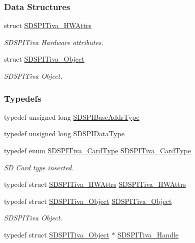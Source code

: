 \subsubsection*{Data Structures}
\begin{DoxyCompactItemize}
\item 
struct \hyperlink{struct_s_d_s_p_i_tiva___h_w_attrs}{S\+D\+S\+P\+I\+Tiva\+\_\+\+H\+W\+Attrs}
\begin{DoxyCompactList}\small\item\em S\+D\+S\+P\+I\+Tiva Hardware attributes. \end{DoxyCompactList}\item 
struct \hyperlink{struct_s_d_s_p_i_tiva___object}{S\+D\+S\+P\+I\+Tiva\+\_\+\+Object}
\begin{DoxyCompactList}\small\item\em S\+D\+S\+P\+I\+Tiva Object. \end{DoxyCompactList}\end{DoxyCompactItemize}
\subsubsection*{Typedefs}
\begin{DoxyCompactItemize}
\item 
typedef unsigned long \hyperlink{_s_d_s_p_i_tiva_8h_ad2ee2f6fbdb79c0577161ae92a7f1650}{S\+D\+S\+P\+I\+Base\+Addr\+Type}
\item 
typedef unsigned long \hyperlink{_s_d_s_p_i_tiva_8h_ae10295fbeb91d6f844cc3694462f6a4b}{S\+D\+S\+P\+I\+Data\+Type}
\item 
typedef enum \hyperlink{_s_d_s_p_i_tiva_8h_a735a3f0fb087ca4e97c2e43ed68b1a0a}{S\+D\+S\+P\+I\+Tiva\+\_\+\+Card\+Type} \hyperlink{_s_d_s_p_i_tiva_8h_a8be51464b363a4b75b1fc43f2c024a7b}{S\+D\+S\+P\+I\+Tiva\+\_\+\+Card\+Type}
\begin{DoxyCompactList}\small\item\em S\+D Card type inserted. \end{DoxyCompactList}\item 
typedef struct \hyperlink{struct_s_d_s_p_i_tiva___h_w_attrs}{S\+D\+S\+P\+I\+Tiva\+\_\+\+H\+W\+Attrs} \hyperlink{_s_d_s_p_i_tiva_8h_ac5f29095c7480b699bca3f48b02aa425}{S\+D\+S\+P\+I\+Tiva\+\_\+\+H\+W\+Attrs}
\item 
typedef struct \hyperlink{struct_s_d_s_p_i_tiva___object}{S\+D\+S\+P\+I\+Tiva\+\_\+\+Object} \hyperlink{_s_d_s_p_i_tiva_8h_ae4ba47bb2c40444c9cc6320f1a36008c}{S\+D\+S\+P\+I\+Tiva\+\_\+\+Object}
\begin{DoxyCompactList}\small\item\em S\+D\+S\+P\+I\+Tiva Object. \end{DoxyCompactList}\item 
typedef struct \hyperlink{struct_s_d_s_p_i_tiva___object}{S\+D\+S\+P\+I\+Tiva\+\_\+\+Object} $\ast$ \hyperlink{_s_d_s_p_i_tiva_8h_ac351c9ecad35997bc63232591cc2f13e}{S\+D\+S\+P\+I\+Tiva\+\_\+\+Handle}
\end{DoxyCompactItemize}
